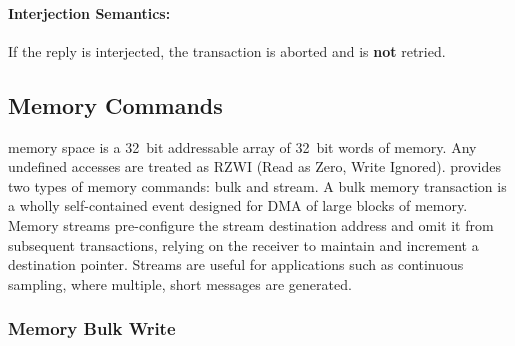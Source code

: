 \paragraph{Interjection Semantics:} If the reply is interjected, the
transaction is aborted and is {\bf not} retried.

\subsection{Memory Commands}
\label{cmd:mem}
\proto memory space is a 32~bit addressable array of 32~bit words of memory.
Any undefined accesses are treated as RZWI (Read as Zero, Write Ignored).
\proto provides two types of memory commands: bulk and stream. A bulk memory
transaction is a wholly self-contained event designed for DMA of large blocks
of memory. Memory streams pre-configure the stream destination address and
omit it from subsequent transactions, relying on the receiver to maintain and
increment a destination pointer. Streams are useful for applications such as
continuous sampling, where multiple, short messages are generated.

\subsubsection{Memory Bulk Write}
\label{cmd:mem-bulk-write}

